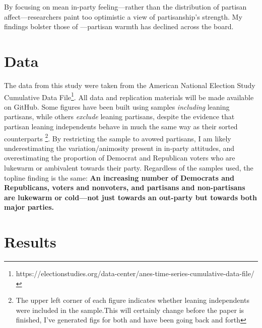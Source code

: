 \documentclass[12pt]{paper}
\begin{document}


By focusing on mean in-party feeling---rather than the distribution of partisan affect---researchers paint too optimistic a view of partisanship's strength. My findings bolster those of  \cite{klar2018affective}---partisan warmth has declined across the board.




\section{Data}

The data from this study were taken from the American National Election Study Cumulative Data File\footnote{https://electionstudies.org/data-center/anes-time-series-cumulative-data-file/}. All data and replication materials will be made available on GitHub. Some figures have been built using samples \textit{including} leaning partisans, while others \textit{exclude} leaning partisans, despite the evidence that partisan leaning independents behave in much the same way as their sorted counterparts \citep{klar2016independent}\footnote{The upper left corner of each figure indicates whether leaning independents were included in the sample.This will certainly change before the paper is finished, I've generated figs for both and have been going back and forth}. By restricting the sample to avowed partisans, I am likely underestimating the variation/animosity present in in-party attitudes, and overestimating the proportion of Democrat and Republican voters who are lukewarm or ambivalent towards their party. Regardless of the samples used, the topline finding is the same: \textbf{An increasing number of Democrats and Republicans, voters and nonvoters, and partisans and non-partisans are lukewarm or cold---not just towards an out-party but towards both major parties.}


\section{Results}
\end{document}
